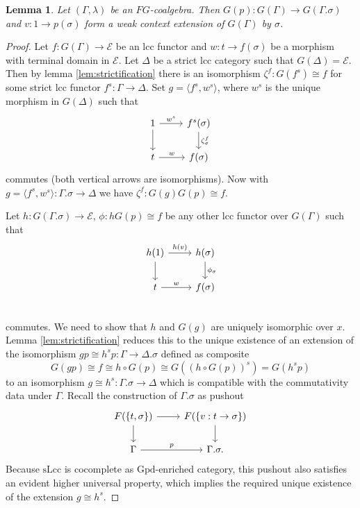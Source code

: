 \documentclass[a4paper]{article}
\newtheorem{lemma}[theorem]{Lemma}
\theoremstyle{remark}
\theoremstyle{definition}
\begin{document}
\begin{lemma}
  \label{lem:strict-ext-is-weak-ext}
  Let $(\Gamma, \lambda)$ be an $FG$-coalgebra.
  Then $G(p) : G(\Gamma) \rightarrow G(\Gamma.\sigma)$ and $v : 1 \rightarrow p(\sigma)$ form a weak context extension of $G(\Gamma)$ by $\sigma$.
\end{lemma}
\begin{proof}
  Let $f : G(\Gamma) \rightarrow \mathcal{E}$ be an lcc functor and $w : t \rightarrow  f(\sigma)$ be a morphism with terminal domain in $\mathcal{E}$.
  Let $\Delta$ be a strict lcc category such that $G(\Delta) = \mathcal{E}$.
  Then by lemma \ref{lem:strictification} there is an isomorphism $\zeta^f : G(f^s) \cong f$ for some strict lcc functor $f^s : \Gamma \rightarrow \Delta$.
  Set $g = \langle f^s, w^s \rangle$, where $w^s$ is the unique morphism in $G(\Delta)$ such that
  \begin{equation}
    \begin{tikzcd}
      1 \arrow[d] \arrow[r, "w^s"] & f^s(\sigma) \arrow[d, "\zeta^f_\sigma"] \\
      t \arrow[r, "w"] & f(\sigma)
    \end{tikzcd}
  \end{equation}
  commutes (both vertical arrows are isomorphisms).
  Now with $g = \langle f^s, w^s \rangle : \Gamma.\sigma \rightarrow \Delta$ we have $\zeta^f : G(g) G(p) \cong f$.

  Let $h : G(\Gamma.\sigma) \rightarrow \mathcal{E}$, $\phi : h G(p) \cong f$ be any other lcc functor over $G(\Gamma)$ such that
  \begin{equation}
    \begin{tikzcd}
      h(1) \arrow[d] \arrow[r, "h(v)"] & h(\sigma) \arrow[d, "\phi_\sigma"] \\
      t \arrow[r, "w"] & f(\sigma) \\
    \end{tikzcd}
  \end{equation}
  commutes.
  We need to show that $h$ and $G(g)$ are uniquely isomorphic over $x$.
  Lemma \ref{lem:strictification} reduces this to the unique existence of an extension of the isomorphism $g p \cong h^s p : \Gamma \rightarrow \Delta.\sigma$ defined as composite
  \begin{equation}
    G(gp) \cong f \cong h \circ G(p) \cong G((h \circ G(p))^s) = G(h^s p)
  \end{equation}
  to an isomorphism $g \cong h^s : \Gamma.\sigma \rightarrow \Delta$ which is compatible with the commutativity data under $\Gamma$.
  Recall the construction of $\Gamma.\sigma$ as pushout
  \begin{equation}
    \begin{tikzcd}
      F(\{ t, \sigma \}) \arrow[d] \arrow[r] & F(\{ v : t \rightarrow \sigma \}) \arrow[d] \\
      \Gamma \arrow[r, "p"] & \Gamma.\sigma.
    \end{tikzcd}
  \end{equation}
  Because $\mathrm{sLcc}$ is cocomplete as $\mathrm{Gpd}$-enriched category, this pushout also satisfies an evident higher universal property, which implies the required unique existence of the extension $g \cong h^s$.
\end{proof}
\end{document}

